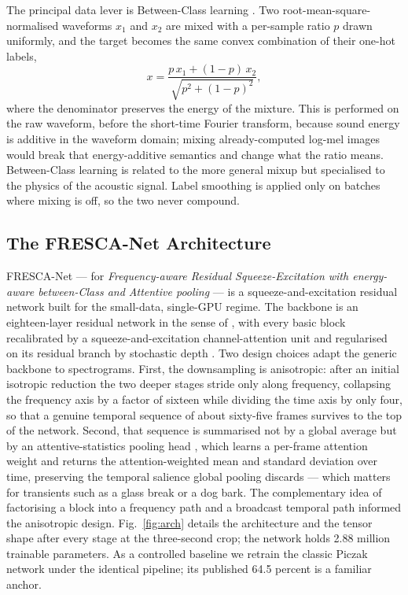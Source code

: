 \documentclass[conference]{IEEEtran}
\begin{document}
The principal data lever is Between-Class learning \cite{tokozume_bc}. Two root-mean-square-normalised waveforms $x_1$ and $x_2$ are mixed with a per-sample ratio $p$ drawn uniformly, and the target becomes the same convex combination of their one-hot labels,
\begin{equation}
x = \frac{p\,x_1 + (1-p)\,x_2}{\sqrt{p^2 + (1-p)^2}}, \label{eq:bc}
\end{equation}
where the denominator preserves the energy of the mixture. This is performed on the raw waveform, before the short-time Fourier transform, because sound energy is additive in the waveform domain; mixing already-computed log-mel images would break that energy-additive semantics and change what the ratio means. Between-Class learning is related to the more general mixup \cite{zhang_mixup} but specialised to the physics of the acoustic signal. Label smoothing \cite{muller_labelsmoothing} is applied only on batches where mixing is off, so the two never compound.

\subsection{The FRESCA-Net Architecture}
FRESCA-Net --- for \emph{Frequency-aware Residual Squeeze-Excitation with energy-aware between-Class and Attentive pooling} --- is a squeeze-and-excitation residual network built for the small-data, single-GPU regime. The backbone is an eighteen-layer residual network in the sense of \cite{he_resnet}, with every basic block recalibrated by a squeeze-and-excitation channel-attention unit \cite{hu_senet} and regularised on its residual branch by stochastic depth \cite{huang_stochastic}. Two design choices adapt the generic backbone to spectrograms. First, the downsampling is anisotropic: after an initial isotropic reduction the two deeper stages stride only along frequency, collapsing the frequency axis by a factor of sixteen while dividing the time axis by only four, so that a genuine temporal sequence of about sixty-five frames survives to the top of the network. Second, that sequence is summarised not by a global average but by an attentive-statistics pooling head \cite{okabe_asp}, which learns a per-frame attention weight and returns the attention-weighted mean and standard deviation over time, preserving the temporal salience global pooling discards --- which matters for transients such as a glass break or a dog bark. The complementary idea of factorising a block into a frequency path and a broadcast temporal path \cite{kim_bcresnet} informed the anisotropic design. Fig.~\ref{fig:arch} details the architecture and the tensor shape after every stage at the three-second crop; the network holds 2.88 million trainable parameters. As a controlled baseline we retrain the classic Piczak network \cite{piczak_cnn} under the identical pipeline; its published 64.5 percent is a familiar anchor.
\end{document}
